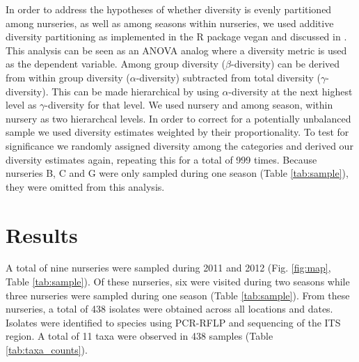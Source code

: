 \documentclass[12pt]{article}
\begin{document}
In order to address the hypotheses of whether diversity is evenly partitioned among nurseries, as well as among seasons within nurseries, we used additive diversity partitioning as implemented in the R package vegan \cite{vegan} and discussed in \cite{lande_1996, christ_etal_2003}.  This analysis can be seen as an ANOVA analog where a diversity metric is used as the dependent variable.  Among group diversity ($\beta$-diversity) can be derived from within group diversity ($\alpha$-diversity) subtracted from total diversity ($\gamma$-diversity).  This can be made hierarchical by using $\alpha$-diversity at the next highest level as $\gamma$-diversity for that level.  We used nursery and among season, within nursery as two hierarchcal levels.  In order to correct for a potentially unbalanced sample we used diversity estimates weighted by their proportionality.  To test for significance we randomly assigned diversity among the categories and derived our diversity estimates again, repeating this for a total of 999 times.  Because nurseries B, C and G  were only sampled during one season (Table \ref{tab:sample}), they were omitted from this analysis.


\section*{\sffamily\normalsize{Results}}

A total of nine nurseries were sampled during 2011 and 2012 (Fig. \ref{fig:map}, Table \ref{tab:sample}).  Of these nurseries, six were visited during two seasons while three nurseries were sampled during one season (Table \ref{tab:sample}).  From these nurseries, a total of 438 isolates were obtained across all locations and dates.  Isolates were identified to species using PCR-RFLP and sequencing of the ITS region. A total of 11 taxa were observed in 438 samples (Table \ref{tab:taxa_counts}).
\end{document}
